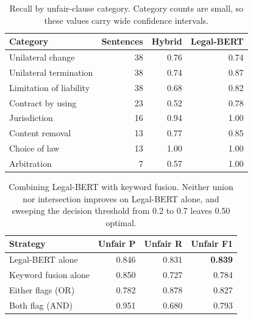\begin{table}[!t]
\centering
\caption{Recall by unfair-clause category. Category counts are small, so these values carry wide confidence intervals.}
\label{tab:category-recall}
\footnotesize
\begin{tabular}{lrrr}
\toprule
Category & Sentences & Hybrid & Legal-BERT \\
\midrule
Unilateral change & 38 & 0.76 & 0.74 \\
Unilateral termination & 38 & 0.74 & 0.87 \\
Limitation of liability & 38 & 0.68 & 0.82 \\
Contract by using & 23 & 0.52 & 0.78 \\
Jurisdiction & 16 & 0.94 & 1.00 \\
Content removal & 13 & 0.77 & 0.85 \\
Choice of law & 13 & 1.00 & 1.00 \\
Arbitration & 7 & 0.57 & 1.00 \\
\bottomrule
\end{tabular}
\end{table}

\begin{table}[!t]
\centering
\caption{Combining Legal-BERT with keyword fusion. Neither union nor intersection improves on Legal-BERT alone,
and sweeping the decision threshold from 0.2 to 0.7 leaves 0.50 optimal.}
\label{tab:combination}
\footnotesize
\begin{tabular}{lrrr}
\toprule
Strategy & Unfair P & Unfair R & Unfair F1 \\
\midrule
Legal-BERT alone & 0.846 & 0.831 & \textbf{0.839} \\
Keyword fusion alone & 0.850 & 0.727 & 0.784 \\
Either flags (OR) & 0.782 & 0.878 & 0.827 \\
Both flag (AND) & 0.951 & 0.680 & 0.793 \\
\bottomrule
\end{tabular}
\end{table}

